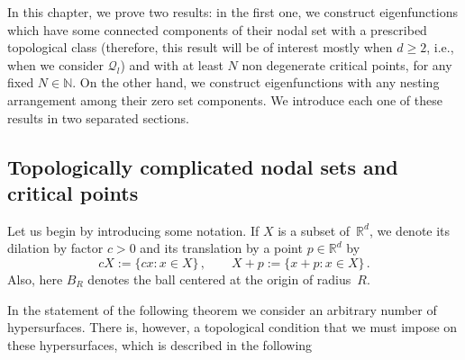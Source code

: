 \documentclass{amsart}
\theoremstyle{definition}
\theoremstyle{remark}
\def\NN{\mathbb{N}}
\def\RR{\mathbb{R}}
\renewcommand\geq\geqslant
\numberwithin{equation}{section}
\theoremstyle{definition}
\theoremstyle{remark}
\def\RR{\mathbb{R}}
\def\NN{\mathbb{N}}
\begin{document}
In this chapter, we prove two results: in the first one, we construct eigenfunctions which have some connected components of their nodal set with a prescribed topological class (therefore, this result will be of interest mostly when $d\geq2$, i.e., when we consider $\mathcal{Q}_l$) and with at least $N$ non degenerate critical points, for any fixed $N\in\NN$. On the other hand, we construct eigenfunctions with any nesting
arrangement among their zero set components. We introduce each one of these results in two separated sections.

\subsection{Topologically complicated nodal sets and critical points}
Let us begin by introducing some notation. If $X$ is a subset of~$\RR^d$, we denote its dilation by factor $c>0$ and its translation by a point $p\in\RR^d$ by
\begin{equation}
cX:=\{cx: x\in X\}\,,\qquad X+ p:=\{x+p: x\in X\}\,.
\end{equation}
Also, here $B_R$ denotes the ball centered at the origin of radius~$R$.

In the statement of the following theorem we consider an arbitrary number of hypersurfaces. There is, however, a topological condition that we must impose on these hypersurfaces, which is described in the following
\end{document}
